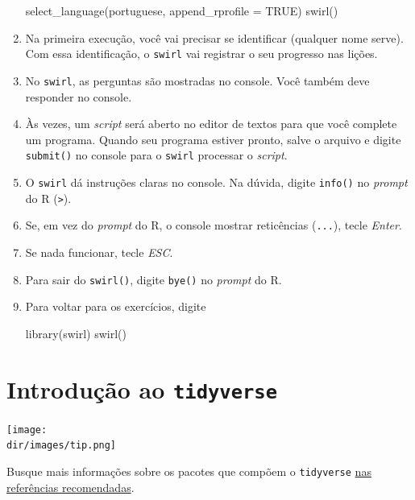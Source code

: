 \documentclass[
  11pt]{report}
\newenvironment{Shaded}{\begin{snugshade}}{\end{snugshade}}
\newcommand{\AttributeTok}[1]{\textcolor[rgb]{0.77,0.63,0.00}{#1}}
\newcommand{\ConstantTok}[1]{\textcolor[rgb]{0.00,0.00,0.00}{#1}}
\newcommand{\FunctionTok}[1]{\textcolor[rgb]{0.00,0.00,0.00}{#1}}
\newcommand{\NormalTok}[1]{#1}
\newcommand{\StringTok}[1]{\textcolor[rgb]{0.31,0.60,0.02}{#1}}
\newcommand{\dir}{/ssd/R/x86_64-pc-linux-gnu-library/4.1/fnaufelRmd/rmarkdown/resources}
\newenvironment{rmdtip}
{
  \begin{mytip}
    \texttt{[image: \\dir/images/tip.png]}
    \tcblower
  }
  {
  \end{mytip}
}
\renewenvironment{Shaded}{
    \begin{mdframed}[%
      roundcorner=2pt,%
      innerleftmargin=5pt,%
      innerrightmargin=5pt,%
      topline=true,%
      leftline=true,%
      rightline=true,%
      bottomline=true,%
      linewidth=0.5pt,%
      linecolor=black!20,%
      backgroundcolor=black!2,%
      skipabove=2ex,%
      skipbelow=2.5ex%
    ]%
  }
  {
    \end{mdframed}
  }
\begin{document}
\begin{enumerate}
\begin{Shaded}
\begin{Highlighting}[]
\FunctionTok{select\_language}\NormalTok{(}\StringTok{\textquotesingle{}portuguese\textquotesingle{}}\NormalTok{, }\AttributeTok{append\_rprofile =} \ConstantTok{TRUE}\NormalTok{)}
\FunctionTok{swirl}\NormalTok{()}
\end{Highlighting}
\end{Shaded}
\item
  Na primeira execução, você vai precisar se identificar (qualquer nome serve). Com essa identificação, o \texttt{swirl} vai registrar o seu progresso nas lições.
\item
  No \texttt{swirl}, as perguntas são mostradas no console. Você também deve responder no console.
\item
  Às vezes, um \emph{script} será aberto no editor de textos para que você complete um programa. Quando seu programa estiver pronto, salve o arquivo e digite \texttt{submit()} no console para o \texttt{swirl} processar o \emph{script}.
\item
  O \texttt{swirl} dá instruções claras no console. Na dúvida, digite \texttt{info()} no \emph{prompt} do R (\texttt{\textgreater{}}).
\item
  Se, em vez do \emph{prompt} do R, o console mostrar reticências (\texttt{...}), tecle \emph{Enter}.
\item
  Se nada funcionar, tecle \emph{ESC}.
\item
  Para sair do \texttt{swirl()}, digite \texttt{bye()} no \emph{prompt} do R.
\item
  Para voltar para os exercícios, digite

\begin{Shaded}
\begin{Highlighting}[]
\FunctionTok{library}\NormalTok{(swirl)}
\FunctionTok{swirl}\NormalTok{()}
\end{Highlighting}
\end{Shaded}
\end{enumerate}

\hypertarget{introduuxe7uxe3o-ao-tidyverse}{%
\chapter{\texorpdfstring{Introdução ao \texttt{tidyverse}}{Introdução ao tidyverse}}\label{introduuxe7uxe3o-ao-tidyverse}}

\begin{rmdtip}
Busque mais informações sobre os pacotes que compõem o \texttt{tidyverse} \protect\hyperlink{refrec}{nas referências recomendadas}.

\end{rmdtip}
\end{document}
